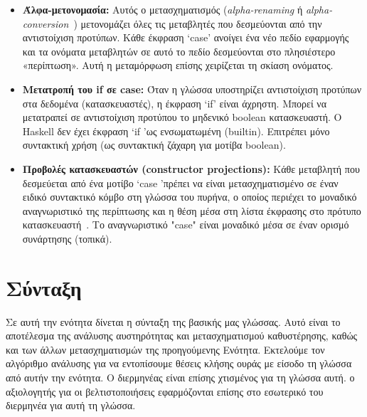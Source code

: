 \documentclass[diploma]{softlab-thesis}
\begin{document}
\begin{itemize}
\item \textbf{Άλφα-μετονομασία:} Αυτός ο μετασχηματισμός (\emph{alpha-renaming} ή \emph{alpha-conversion}~\cite{Barendregt:1993:LCT:162552.162561}) μετονομάζει όλες τις μεταβλητές που δεσμεύονται από την αντιστοίχιση προτύπων.
Κάθε έκφραση `case' ανοίγει ένα νέο πεδίο εφαρμογής και τα ονόματα μεταβλητών σε αυτό το πεδίο δεσμεύονται στο πλησιέστερο
«περίπτωση». Αυτή η μεταμόρφωση επίσης χειρίζεται τη σκίαση ονόματος.
\item \textbf{Μετατροπή του if σε case:} Όταν η γλώσσα υποστηρίζει αντιστοίχιση προτύπων στα δεδομένα
(κατασκευαστές), η έκφραση `if' είναι άχρηστη. Μπορεί να μετατραπεί σε αντιστοίχιση προτύπου
το μηδενικό boolean κατασκευαστή. Ο Haskell δεν έχει έκφραση `if 'ως ενσωματωμένη (builtin). 
Eπιτρέπει μόνο συντακτική χρήση (ως συντακτική ζάχαρη για μοτίβα boolean).
\item \textbf{Προβολές κατασκευαστών (constructor projections):} Κάθε μεταβλητή που δεσμεύεται από ένα μοτίβο 
`case 'πρέπει να είναι μετασχηματισμένο σε έναν ειδικό συντακτικό κόμβο στη γλώσσα του πυρήνα, 
ο οποίος περιέχει το μοναδικό αναγνωριστικό της περίπτωσης και η θέση μέσα στη λίστα έκφρασης 
στο πρότυπο κατασκευαστή~\cite{Fourtounis:2013:GIT:2769663.2769674}. 
Το αναγνωριστικό "case" είναι μοναδικό μέσα σε έναν ορισμό συνάρτησης (τοπικά).
\end{itemize}

\section{Σύνταξη}

Σε αυτή την ενότητα δίνεται η σύνταξη της βασικής μας γλώσσας.
Αυτό είναι το αποτέλεσμα της ανάλυσης αυστηρότητας και
μετασχηματισμού καθυστέρησης, καθώς και των άλλων μετασχηματισμών της προηγούμενης
Ενότητα. Εκτελούμε τον αλγόριθμο ανάλυσης για να εντοπίσουμε θέσεις κλήσης ουράς με είσοδο
τη γλώσσα από αυτήν την ενότητα. Ο διερμηνέας είναι επίσης χτισμένος για τη γλώσσα αυτή. 
ο αξιολογητής για
οι βελτιστοποιήσεις εφαρμόζονται επίσης στο εσωτερικό του διερμηνέα για αυτή τη γλώσσα.
\end{document}
